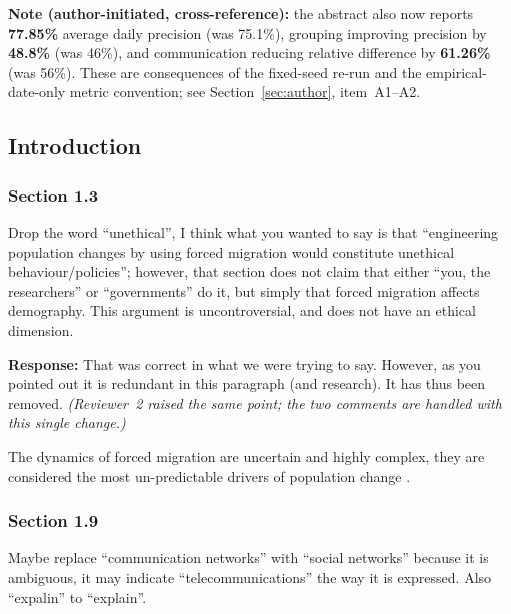 \documentclass[11pt,a4paper]{article}
\begin{document}
\vspace{0.3cm}
\begin{flagbox}
\textbf{Note (author-initiated, cross-reference):} the abstract also now reports \textbf{77.85\%} average
daily precision (was 75.1\%), grouping improving precision by \textbf{48.8\%} (was 46\%), and communication
reducing relative difference by \textbf{61.26\%} (was 56\%). These are consequences of the fixed-seed re-run
and the empirical-date-only metric convention; see Section~\ref{sec:author}, item~A1--A2.
\end{flagbox}

\subsection*{Introduction}

\subsubsection*{Section 1.3}

\begin{reviewbox}
Drop the word ``unethical'', I think what you wanted to say is that ``engineering population changes by using forced migration would constitute unethical behaviour/policies''; however, that section does not claim that either ``you, the researchers'' or ``governments'' do it, but simply that forced migration affects demography. This argument is uncontroversial, and does not have an ethical dimension.
\end{reviewbox}

\textbf{Response:} That was correct in what we were trying to say. However, as you pointed out it is
redundant in this paragraph (and research). It has thus been removed. \emph{(Reviewer~2 raised the same
point; the two comments are handled with this single change.)}

\vspace{0.3cm}
\begin{updatebox}
The dynamics of forced migration are uncertain and highly complex, they are considered the most un-predictable
drivers of population change \citep{NRC2000}.
\end{updatebox}

\subsubsection*{Section 1.9}

\begin{reviewbox}
Maybe replace ``communication networks'' with ``social networks'' because it is ambiguous, it may indicate ``telecommunications'' the way it is expressed.
Also ``expalin'' to ``explain''.
\end{reviewbox}
\end{document}
